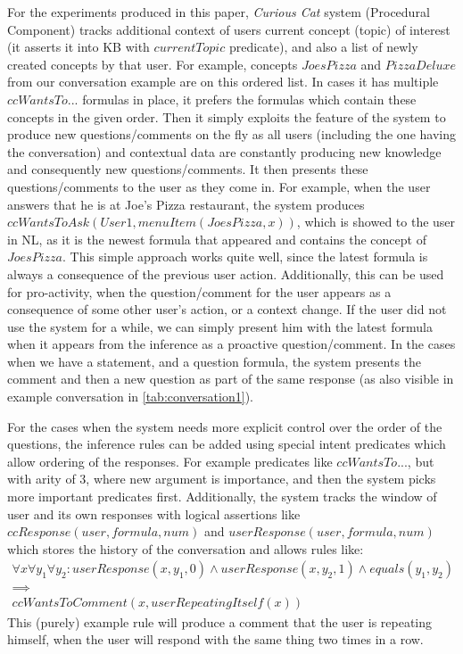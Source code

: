 For the experiments produced in this paper, \emph{Curious Cat} system 
(Procedural Component) tracks additional context of users current concept 
(topic) of interest (it asserts it into KB with $currentTopic$ predicate), and 
also a list of newly created concepts by that user. For example, concepts 
$JoesPizza$ and $PizzaDeluxe$ from our conversation example are on this ordered
list. In cases it has multiple $ccWantsTo...$ formulas in place, it prefers 
the formulas which contain these concepts in the given order. Then it simply 
exploits the feature of the system to produce new questions/comments on the fly
as all users (including the one having the conversation) and contextual data 
are constantly producing new knowledge and consequently new questions/comments.
It then presents these questions/comments to the user as they come in. For 
example, when the user answers that he is at Joe's Pizza restaurant, the system 
produces $ccWantsToAsk(User1, menuItem(JoesPizza,x))$, which is showed to the 
user in NL, as it is the newest formula that appeared and contains the concept 
of $JoesPizza$. This simple approach works quite well, since the latest formula 
is always a consequence of the previous user action. Additionally, this can be 
used for pro-activity, when the question/comment for the user appears as a 
consequence of some other user's action, or a context change. If the user did not
use the system for a while, we can simply present him with the latest formula 
when it appears from the inference as a proactive question/comment. In the cases
when we have a statement, and a question formula, the system presents the 
comment and then a new question as part of the same response (as also visible
in example conversation in \autoref{tab:conversation1}).

For the cases when the system needs more explicit control over the order of 
the questions, the inference rules can be added using special intent predicates
which allow ordering of the responses. For example predicates like 
$ccWantsTo...$, but with arity of 3, where new argument is importance, and then
the system picks more important predicates first. Additionally, the system 
tracks the window of user and its own responses with logical assertions like 
$ccResponse(user,formula,num)$ and $userResponse(user,formula,num)$ which 
stores the history of the conversation and allows rules like:
\begin{equation*}
\begin{gathered}
	\forall x \forall y_1 \forall y_2: userResponse(x,y_1,0) \land userResponse(x,y_2,1) \land equals(y_1,y_2) \\
	\implies \\
	ccWantsToComment(x,userRepeatingItself(x))
\end{gathered}
\end{equation*}
This (purely) example rule will produce a comment that the user is repeating 
himself, when the user will respond with the same thing two times in a row.

